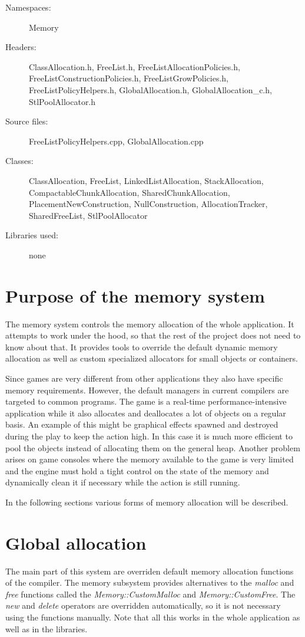 \begin{description}
  \item[Namespaces:] Memory
  \item[Headers:] ClassAllocation.h, FreeList.h, FreeListAllocationPolicies.h, Free\-List\-Construction\-Policies.h, FreeListGrowPolicies.h, Free\-List\-Policy\-Hel\-pers\-.h, GlobalAllocation.h, GlobalAllocation\_c.h, StlPoolAllocator.h
  \item[Source files:] FreeListPolicyHelpers.cpp, GlobalAllocation.cpp
  \item[Classes:] ClassAllocation, FreeList, LinkedListAllocation, Stack\-Allocation, CompactableChunkAllocation, SharedChunkAllocation, Placement\-New\-Construction, NullConstruction, AllocationTracker, Shared\-Free\-List, Stl\-Pool\-Allocator
  \item[Libraries used:] none
\end{description}


\section{Purpose of the memory system}
The memory system controls the memory allocation of the whole application. It attempts to work under the hood, so that the rest of the project does not need to know about that. It provides tools to override the default dynamic memory allocation as well as custom specialized allocators for small objects or containers.

Since games are very different from other applications they also have specific memory requirements. However, the default managers in current compilers are targeted to common programs. The game is a real-time per\-for\-man\-ce-in\-ten\-si\-ve application while it also allocates and deallocates a lot of objects on a regular basis. An example of this might be graphical effects spawned and destroyed during the play to keep the action high. In this case it is much more efficient to pool the objects instead of allocating them on the general heap. Another problem arises on game consoles where the memory available to the game is very limited and the engine must hold a tight control on the state of the memory and dynamically clean it if necessary while the action is still running.

In the following sections various forms of memory allocation will be described.

\section{Global allocation}
The main part of this system are overriden default memory allocation functions of the compiler. The memory subsystem provides alternatives to the \emph{malloc} and \emph{free} functions called the \emph{Memory::CustomMalloc} and \emph{Memory\-::\-Custom\-Free}. The \emph{new} and \emph{delete} operators are overridden automatically, so it is not necessary using the functions manually. Note that all this works in the whole application as well as in the libraries.

